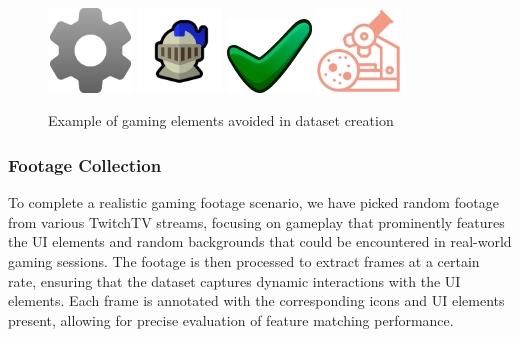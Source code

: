 \begin{figure}[H]
    \centering
    \includegraphics[width=0.2\textwidth]{ressources/bad_icon1.png} \hfill
    \includegraphics[width=0.2\textwidth]{ressources/bad_icon2.png} \hfill
    \includegraphics[width=0.2\textwidth]{ressources/bad_icon3.png} \hfill
    \includegraphics[width=0.2\textwidth]{ressources/bad_icon4.png} \hfill
    \caption{Example of gaming elements avoided in dataset creation}
    \label{fig:bad_icons}
\end{figure}
\subsubsection{Footage Collection}
To complete a realistic gaming footage scenario, we have picked random footage
from various TwitchTV streams, focusing on gameplay that prominently features
the UI elements and random backgrounds that could be encountered in real-world
gaming sessions. The footage is then processed to extract frames at a certain
rate, ensuring that the dataset captures dynamic interactions with the UI
elements. Each frame is annotated with the corresponding icons and UI elements
present, allowing for precise evaluation of feature matching performance.

